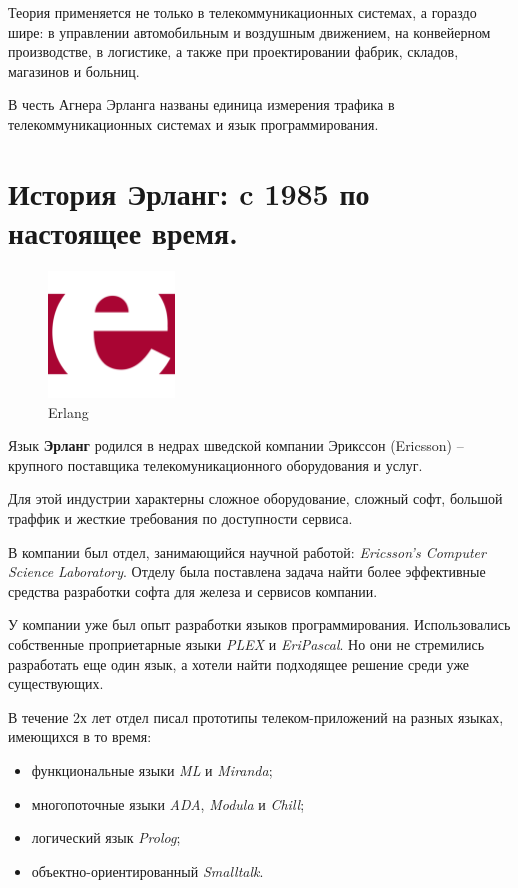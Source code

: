 Теория применяется не только в телекоммуникационных системах, а гораздо шире: в управлении автомобильным и воздушным движением, на конвейерном производстве, в логистике, а также при проектировании фабрик, складов, магазинов и больниц.

В честь Агнера Эрланга названы единица измерения трафика в телекоммуникационных системах и язык программирования.

\section{История Эрланг: c 1985 по настоящее время.}

\begin{figure}[h]
  \centering
  \includegraphics[width=0.3\textwidth]{./lesson_02/img/erlang_logo.png}
  \caption{Erlang}
\end{figure}

Язык \textbf{Эрланг} родился в недрах шведской компании Эрикссон (Ericsson) -- крупного поставщика телекомуникационного оборудования и услуг.

Для этой индустрии характерны сложное оборудование, сложный софт, большой траффик и жесткие требования по доступности сервиса.

В компании был отдел, занимающийся научной работой: \textit{Ericsson’s Computer Science Laboratory}. Отделу была поставлена задача найти более эффективные средства разработки софта для железа и сервисов компании.

У компании уже был опыт разработки языков программирования. Использовались собственные проприетарные языки \textit{PLEX} и \textit{EriPascal}. Но они не стремились разработать еще один язык, а хотели найти подходящее решение среди уже существующих.

В течение 2х лет отдел писал прототипы телеком-приложений на разных языках, имеющихся в то время:
\begin{itemize}
\item функциональные языки \textit{ML} и \textit{Miranda};
\item многопоточные языки \textit{ADA}, \textit{Modula} и \textit{Chill};
\item логический язык \textit{Prolog};
\item объектно-ориентированный \textit{Smalltalk}.
\end{itemize}

